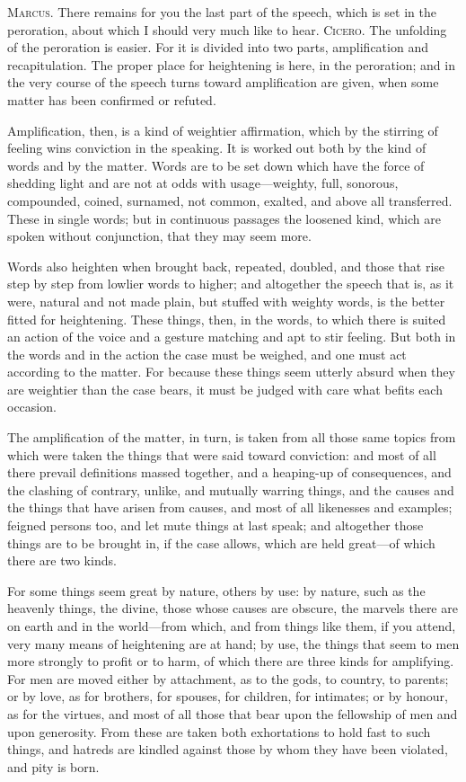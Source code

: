  \textsc{Marcus.} There remains for you the last part of the speech, which is set in the peroration, about which I should very much like to hear. \textsc{Cicero.} The unfolding of the peroration is easier. For it is divided into two parts, amplification and recapitulation. The proper place for heightening is here, in the peroration; and in the very course of the speech turns toward amplification are given, when some matter has been confirmed or refuted.

 Amplification, then, is a kind of weightier affirmation, which by the stirring of feeling wins conviction in the speaking. It is worked out both by the kind of words and by the matter. Words are to be set down which have the force of shedding light and are not at odds with usage—weighty, full, sonorous, compounded, coined, surnamed, not common, exalted, and above all transferred. These in single words; but in continuous passages the loosened kind, which are spoken without conjunction, that they may seem more.

 Words also heighten when brought back, repeated, doubled, and those that rise step by step from lowlier words to higher; and altogether the speech that is, as it were, natural and not made plain, but stuffed with weighty words, is the better fitted for heightening. These things, then, in the words, to which there is suited an action of the voice and a gesture matching and apt to stir feeling. But both in the words and in the action the case must be weighed, and one must act according to the matter. For because these things seem utterly absurd when they are weightier than the case bears, it must be judged with care what befits each occasion.

 The amplification of the matter, in turn, is taken from all those same topics from which were taken the things that were said toward conviction: and most of all there prevail definitions massed together, and a heaping-up of consequences, and the clashing of contrary, unlike, and mutually warring things, and the causes and the things that have arisen from causes, and most of all likenesses and examples; feigned persons too, and let mute things at last speak; and altogether those things are to be brought in, if the case allows, which are held great—of which there are two kinds.

 For some things seem great by nature, others by use: by nature, such as the heavenly things, the divine, those whose causes are obscure, the marvels there are on earth and in the world—from which, and from things like them, if you attend, very many means of heightening are at hand; by use, the things that seem to men more strongly to profit or to harm, of which there are three kinds for amplifying. For men are moved either by attachment, as to the gods, to country, to parents; or by love, as for brothers, for spouses, for children, for intimates; or by honour, as for the virtues, and most of all those that bear upon the fellowship of men and upon generosity. From these are taken both exhortations to hold fast to such things, and hatreds are kindled against those by whom they have been violated, and pity is born.

